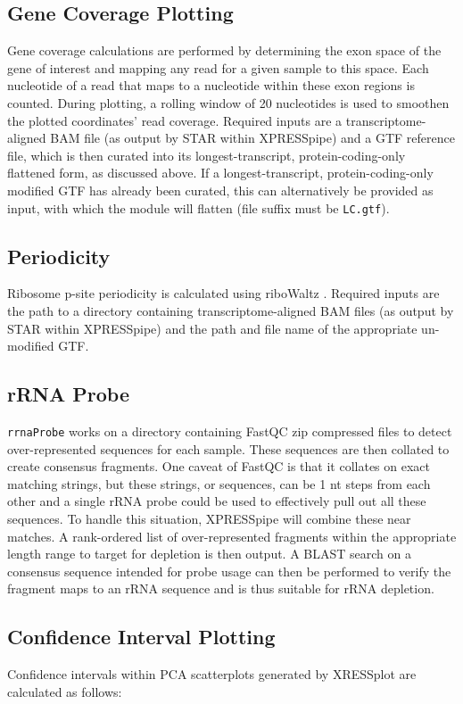 \documentclass[10pt, oneside]{article}
\begin{document}
\subsection{Gene Coverage Plotting}
Gene coverage calculations are performed by determining the exon space of the gene of interest and mapping any read for a given sample to this space. Each nucleotide of a read that maps to a nucleotide within these exon regions is counted. During plotting, a rolling window of 20 nucleotides is used to smoothen the plotted coordinates' read coverage. Required inputs are a transcriptome-aligned BAM file (as output by STAR within XPRESSpipe) and a GTF reference file, which is then curated into its longest-transcript, protein-coding-only flattened form, as discussed above. If a longest-transcript, protein-coding-only modified GTF has already been curated, this can alternatively be provided as input, with which the module will flatten (file suffix must be \texttt{LC.gtf}).

\subsection{Periodicity}
Ribosome p-site periodicity is calculated using riboWaltz \cite{ribowaltz}. Required inputs are the path to a directory containing transcriptome-aligned BAM files (as output by STAR within XPRESSpipe) and the path and file name of the appropriate un-modified GTF.

\subsection{rRNA Probe}
\texttt{rrnaProbe} works on a directory containing FastQC \cite{fastqc} zip compressed files to detect over-represented sequences for each sample. These sequences are then collated to create consensus fragments. One caveat of FastQC is that it collates on exact matching strings, but these strings, or sequences, can be 1 nt steps from each other and a single rRNA probe could be used to effectively pull out all these sequences. To handle this situation, XPRESSpipe will combine these near matches. A rank-ordered list of over-represented fragments within the appropriate length range to target for depletion is then output. A BLAST \cite{blast} search on a consensus sequence intended for probe usage can then be performed to verify the fragment maps to an rRNA sequence and is thus suitable for rRNA depletion.

\subsection{Confidence Interval Plotting}
Confidence intervals within PCA scatterplots generated by XRESSplot are calculated as follows:
\end{document}
